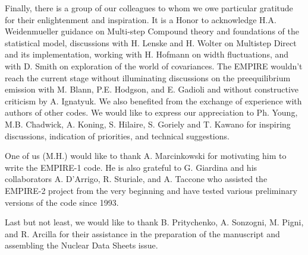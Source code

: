 Finally, there is a group of our colleagues to whom we owe particular
gratitude for their enlightenment and inspiration. It is a Honor to
acknowledge H.A. Weidenmueller guidance on Multi-step Compound theory and
foundations of the statistical model, discussions with H. Lenske and H.
Wolter on Multistep Direct and its implementation, working with H. Hofmann
on width fluctuations, and with D. Smith on exploration of the world of
covariances. The EMPIRE wouldn't reach the current stage without
illuminating discussions on the preequilibrium emission with M. Blann, P.E.
Hodgson, and E. Gadioli and without constructive criticism by A. Ignatyuk.
We also benefited from the exchange of experience with authors of other
codes. We would like to express our appreciation to Ph. Young, M.B.
Chadwick, A. Koning, S. Hilaire, S. Goriely and T. Kawano for inspiring
discussions, indication of priorities, and technical suggestions.

One of us (M.H.) would like to thank A. Marcinkowski for motivating him to
write the EMPIRE-1 code. He is also grateful to G. Giardina and his
collaborators A. D'Arrigo, R. Sturiale, and A. Taccone who assisted the
EMPIRE-2 project from the very beginning and have tested various preliminary
versions of the code since 1993.

Last but not least, we would like to thank B. Pritychenko, A. Sonzogni, M.
Pigni, and R. Arcilla for their assistance in the preparation of the
manuscript and assembling the Nuclear Data Sheets issue.

% 



